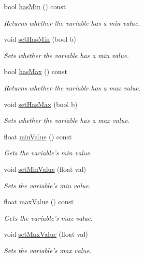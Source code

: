\begin{DoxyCompactItemize}
bool \hyperlink{class_command_sender_info_a0535d20518b5f3dbb358d027784e63fe}{has\-Min} () const 
\begin{DoxyCompactList}\small\item\em Returns whether the variable has a min value. \end{DoxyCompactList}\item 
void \hyperlink{class_command_sender_info_ac46d887956a3edbadc8375a97c85b38f}{set\-Has\-Min} (bool b)
\begin{DoxyCompactList}\small\item\em Sets whether the variable has a min value. \end{DoxyCompactList}\item 
bool \hyperlink{class_command_sender_info_afc6b456de58752c0601f635927c72852}{has\-Max} () const 
\begin{DoxyCompactList}\small\item\em Returns whether the variable has a max value. \end{DoxyCompactList}\item 
void \hyperlink{class_command_sender_info_a69ac1e0453b2a79bc697def44a8d356e}{set\-Has\-Max} (bool b)
\begin{DoxyCompactList}\small\item\em Sets whether the variable has a max value. \end{DoxyCompactList}\item 
float \hyperlink{class_command_sender_info_aa3d7b4f7a78bcc0c0f882b6a479b74dc}{min\-Value} () const 
\begin{DoxyCompactList}\small\item\em Gets the variable's min value. \end{DoxyCompactList}\item 
void \hyperlink{class_command_sender_info_ad1e49e6c18b5d75aacb8c7c68a79ed76}{set\-Min\-Value} (float val)
\begin{DoxyCompactList}\small\item\em Sets the variable's min value. \end{DoxyCompactList}\item 
float \hyperlink{class_command_sender_info_a187eae30c2bc2a2ab98d2cf09bad4a13}{max\-Value} () const 
\begin{DoxyCompactList}\small\item\em Gets the variable's max value. \end{DoxyCompactList}\item 
void \hyperlink{class_command_sender_info_af57f1c16ede28190022994e75206223f}{set\-Max\-Value} (float val)
\begin{DoxyCompactList}\small\item\em Sets the variable's max value. \end{DoxyCompactList}\end{DoxyCompactItemize}

